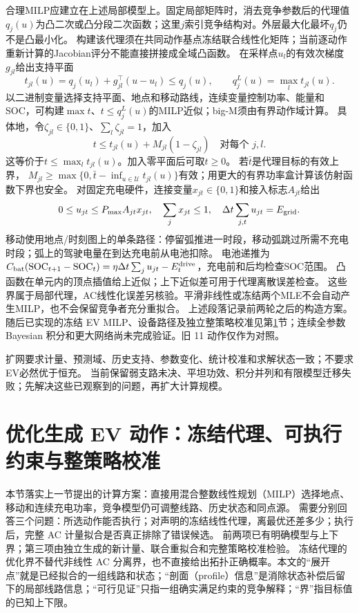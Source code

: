\documentclass[UTF8,fontset=fandol,11pt,a4paper]{ctexart}
\begin{document}
合理MILP应建立在上述局部模型上。固定局部矩阵时，消去竞争参数后的代理值$q_j(u)$为凸二次或凸分段二次函数；这里$j$索引竞争结构对。外层最大化最坏$q_j$仍不是凸最小化。
构建该代理须在共同动作基点冻结联合线性化矩阵；当前逐动作重新计算的Jacobian评分不能直接拼接成全域凸函数。
在采样点$u_l$的有效次梯度$g_{jl}$给出支持平面
\[
 t_{jl}(u)=q_j(u_l)+g_{jl}^\top(u-u_l)\le q_j(u),
 \qquad q_j^L(u)=\max_l t_{jl}(u).
\]
以二进制变量选择支持平面、地点和移动路线，连续变量控制功率、能量和SOC，可构建$\max t$、$t\le q_j^L(u)$的MILP近似；big-M须由有界动作域计算。
具体地，令$\zeta_{jl}\in\{0,1\}$、$\sum_l\zeta_{jl}=1$，加入
\[
 t\le t_{jl}(u)+M_{jl}(1-\zeta_{jl})\quad\text{对每个 }j,l .
\]
这等价于$t\le\max_l t_{jl}(u)$。加入零平面后可取$t\ge0$。
若$\bar t$是代理目标的有效上界，
$M_{jl}\ge\max\{0,\bar t-\inf_{u\in\mathcal U}t_{jl}(u)\}$有效；用更大的有界功率盒计算该仿射函数下界也安全。
对固定充电硬件，连接变量$x_{jt}\in\{0,1\}$和接入标志$A_{jt}$给出
\[
 0\le u_{jt}\le P_{\max}A_{jt}x_{jt},\quad
 \sum_jx_{jt}\le1,\quad
 \Delta t\sum_{j,t}u_{jt}=E_{\rm grid} .
\]
移动使用地点/时刻图上的单条路径：停留弧推进一时段，移动弧跳过所需不充电时段；弧上的驾驶电量在到达充电前从电池扣除。
电池递推为$C_{\rm bat}(\mathrm{SOC}_{t+1}-\mathrm{SOC}_t)=\eta\Delta t\sum_j u_{jt}-E_t^{\rm drive}$，充电前和后均检查SOC范围。
凸函数在单元内的顶点插值给上近似；上下近似差可用于代理离散误差检查。
这些界属于局部代理，AC线性化误差另核验。平滑非线性或冻结两个MLE不会自动产生MILP，也不会保留竞争者充分重拟合。
上述段落记录前两轮之后的构造方案。随后已实现的冻结 EV MILP、设备路径及独立整策略校准见第\ref{sec:adaptive-milp}节；连续全参数 Bayesian 积分和更大网络尚未完成验证。旧 11 动作仅作为对照。

扩网要求计量、预测域、历史支持、参数变化、统计校准和求解状态一致；不要求EV必然优于恒充。
当前保留弱支路未决、平坦功效、积分并列和有限模型迁移失败；先解决这些已观察到的问题，再扩大计算规模。

\section{优化生成 EV 动作：冻结代理、可执行约束与整策略校准}
\label{sec:adaptive-milp}
本节落实上一节提出的计算方案：直接用混合整数线性规划（MILP）选择地点、移动和连续充电功率，竞争模型仍可调整线路、历史状态和同点源。
需要分别回答三个问题：所选动作能否执行；对声明的冻结线性代理，离最优还差多少；执行后，完整 AC 计量拟合是否真正排除了错误候选。
前两项已有明确模型与上下界；第三项由独立生成的新计量、联合重拟合和完整策略校准检验。
冻结代理的优化界不替代非线性 AC 分离界，也不直接给出拓扑正确概率。本文的“展开点”就是已经拟合的一组线路和状态；“剖面（profile）信息”是消除状态补偿后留下的局部线路信息；“可行见证”只指一组确实满足约束的竞争解释；“界”指目标值的已知上下限。
\end{document}

